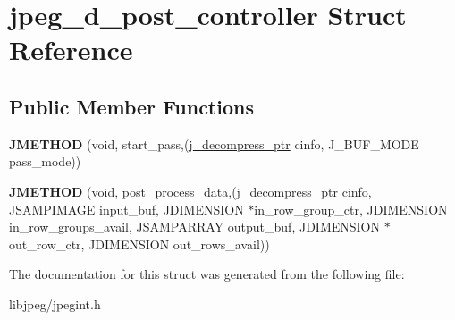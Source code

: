 \hypertarget{structjpeg__d__post__controller}{\section{jpeg\-\_\-d\-\_\-post\-\_\-controller Struct Reference}
\label{structjpeg__d__post__controller}
}
\subsection*{Public Member Functions}
\begin{DoxyCompactItemize}
\item 
\hypertarget{structjpeg__d__post__controller_a349b2ff7508568d13a9294f3e79163aa}{{\bfseries J\-M\-E\-T\-H\-O\-D} (void, start\-\_\-pass,(\hyperlink{structjpeg__decompress__struct}{j\-\_\-decompress\-\_\-ptr} cinfo, J\-\_\-\-B\-U\-F\-\_\-\-M\-O\-D\-E pass\-\_\-mode))}\label{structjpeg__d__post__controller_a349b2ff7508568d13a9294f3e79163aa}

\item 
\hypertarget{structjpeg__d__post__controller_adb337adcfe3a314ceac4b626a73d87c3}{{\bfseries J\-M\-E\-T\-H\-O\-D} (void, post\-\_\-process\-\_\-data,(\hyperlink{structjpeg__decompress__struct}{j\-\_\-decompress\-\_\-ptr} cinfo, J\-S\-A\-M\-P\-I\-M\-A\-G\-E input\-\_\-buf, J\-D\-I\-M\-E\-N\-S\-I\-O\-N $\ast$in\-\_\-row\-\_\-group\-\_\-ctr, J\-D\-I\-M\-E\-N\-S\-I\-O\-N in\-\_\-row\-\_\-groups\-\_\-avail, J\-S\-A\-M\-P\-A\-R\-R\-A\-Y output\-\_\-buf, J\-D\-I\-M\-E\-N\-S\-I\-O\-N $\ast$out\-\_\-row\-\_\-ctr, J\-D\-I\-M\-E\-N\-S\-I\-O\-N out\-\_\-rows\-\_\-avail))}\label{structjpeg__d__post__controller_adb337adcfe3a314ceac4b626a73d87c3}

\end{DoxyCompactItemize}


The documentation for this struct was generated from the following file\-:\begin{DoxyCompactItemize}
\item 
libjpeg/jpegint.\-h\end{DoxyCompactItemize}
